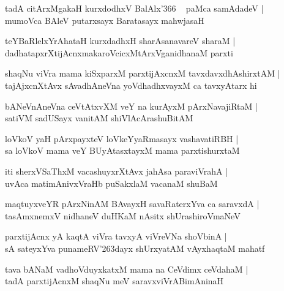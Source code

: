 \documentclass[twoside,12pt,openright]{book}
\def\S{\char'263}
\newcounter{shloka}[chapter]
\begin{document}
\begin{shloka}%
tadA citArxMgakaH kurxdodhxV BalAlx\char'366 ~ paMca samAdadeV |\\
mumoVca BAleV putarxsayx Baratasayx mahwjasaH 
\end{shloka}

\begin{shloka}%
teYBaRlelxYrAhataH kurxdadhxH sharAsanavareV sharaM |\\
dadhatapxrXtijAcnxmakaroVcicxMtArxVganidhanaM parxti
\end{shloka}

\begin{shloka}%
shaqNu viVra mama kiSxparxM parxtijAxcnxM tavxdavxdhAshirxtAM |\\
tajAjxcnXtAvx sAvadhAneVna yoVdhadhxvayxM ca tavxyAtarx hi
\end{shloka}

\begin{shloka}%
bANeVnAneVna ceVtAtxvXM  veY na kurAyxM pArxNavajiRtaM |\\
satiVM sadUSayx vanitAM shiVlAcArashuBitAM 
\end{shloka}

\begin{shloka}%
loVkoV yaH pArxpayxteV loVkeYyaRmasayx vashavatiRBH |\\
sa loVkoV mama veY BUyAtasxtayxM mama parxtishurxtaM 
\end{shloka}

\begin{shloka}%
iti sherxVSaThxM vacashuyxrXtAvx jahAsa paraviVrahA |\\
uvAca matimAnivxVraHb puSakxlaM vacanaM shuBaM 
\end{shloka}

\begin{shloka}%
maqtuyxveYR pArxNinAM BAvayxH savaRaterxYva ca saravxdA |\\
tasAmxnemxV nidhaneV duHKaM nAsitx shUrashiroVmaNeV 
\end{shloka}

\begin{shloka}%
parxtijAcnx yA kaqtA viVra tavxyA viVreVNa shoVbinA |\\
sA sateyxYva punameRV\S dayx shUrxyatAM vAyxhaqtaM mahatf 
\end{shloka}

\begin{shloka}%
tava bANaM vadhoVduyxkatxM mama na CeVdimx ceVdahaM |\\
tadA parxtijAcnxM shaqNu meV saravxviVrABimAninaH 
\end{shloka}
\end{document}
